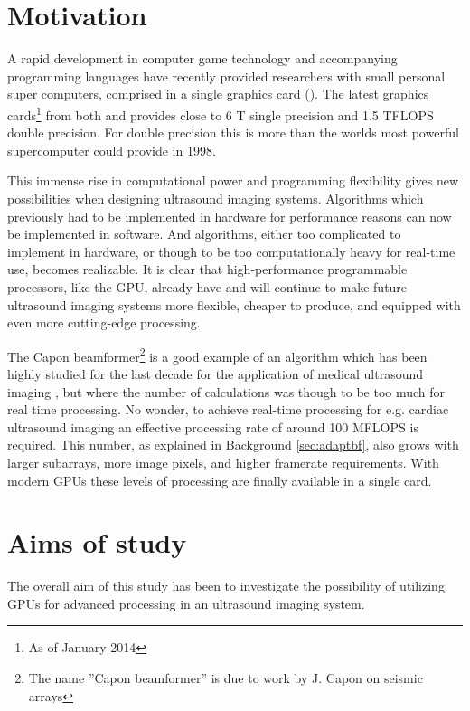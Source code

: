 \section{Motivation}
A rapid development in computer game technology and accompanying programming languages have recently provided researchers with small personal super computers, comprised in a single graphics card (). The latest graphics cards\footnote{As of January 2014} from both  and  provides close to 6 T single precision and 1.5 TFLOPS double precision. For double precision this is more than the worlds most powerful supercomputer could provide in 1998.

This immense rise in computational power and programming flexibility gives new possibilities when designing ultrasound imaging systems. Algorithms which previously had to be implemented in hardware for performance reasons can now be implemented in software. And algorithms, either too complicated to implement in hardware, or though to be too computationally heavy for real-time use, becomes realizable. It is clear that high-performance programmable processors, like the GPU, already have and will continue to make future ultrasound imaging systems more flexible, cheaper to produce, and equipped with even more cutting-edge processing.

The Capon beamformer\footnote{The name ''Capon beamformer'' is due to work by J. Capon  on seismic arrays }  is a good example of an algorithm which has been highly studied for the last decade for the application of medical ultrasound imaging , but where the number of calculations was though to be too much for real time processing. No wonder, to achieve real-time processing for e.g. cardiac ultrasound imaging an effective processing rate of around 100 MFLOPS is required. This number, as explained in Background \ref{sec:adaptbf}, also grows with larger subarrays, more image pixels, and higher framerate requirements.  With modern GPUs these levels of processing are finally available in a single card.

\section{Aims of study}
The overall aim of this study has been to investigate the possibility of utilizing GPUs for advanced processing in an ultrasound imaging system. 

